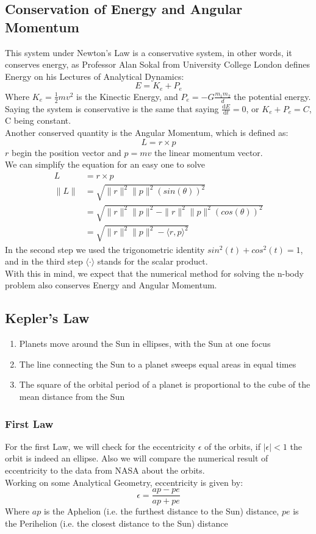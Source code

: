 \documentclass[12pt]{article}
\begin{document}
\subsection{Conservation of Energy and Angular Momentum}
This system under Newton's Law is a conservative system, in other words, it conserves energy, as Professor Alan Sokal\cite{sokal:22} from University College London defines Energy on his Lectures of Analytical Dynamics:
\[
E = K_e + P_e
\]
Where \(K_e = \frac{1}{2} m v^2\) is the Kinectic Energy, and \(P_e = - G \frac{m_1m_2}{d}\) the potential energy.
Saying the system is conservative is the same that saying \(\frac{\mathrm{d}E}{\mathrm{d}t} = 0\), or \( K_e + P_e = C\), C being constant.\\
Another conserved quantity is the Angular Momentum, which is defined as:
\[
L = r \times p
\]
\(r\) begin the position vector and \(p = mv\) the linear momentum vector.\\
We can simplify the equation for an easy one to solve
\begin{align*}
  L &= r \times p\\
  \lVert L \rVert &= \sqrt{\rVert r \lVert^2 \rVert p \lVert^2(sin(\theta))^2} \\
  &= \sqrt{\rVert r \lVert^2 \rVert p \lVert^2 - \rVert r \lVert^2 \rVert p \lVert^2(cos(\theta))^2} \\
  &= \sqrt{\rVert r \lVert^2 \rVert p \lVert^2 - \langle r, p \rangle ^2}
\end{align*}
In the second step we used the trigonometric identity \(sin^2 (t) + cos^2(t) = 1\), and in the third step \(\langle \cdot \rangle\) stands for the scalar product.\\
With this in mind, we expect that the numerical method for solving the n-body problem also conserves Energy and Angular Momentum.

\subsection{Kepler's Law}
\begin{enumerate}
  \item Planets move around the Sun in ellipses, with the Sun at one focus
  \item The line connecting the Sun to a planet sweeps equal areas in equal times
  \item The square of the orbital period of a planet is proportional to the cube of the mean distance from the Sun
\end{enumerate}
\subsubsection{First Law}
For the first Law, we will check for the eccentricity \(\epsilon \) of the orbits, if \(\lvert \epsilon \rvert < 1\) the orbit is indeed an ellipse. Also we will compare the numerical result of eccentricity to the data from NASA about the orbits.\\
Working on some Analytical Geometry, eccentricity is given by:
\[
\epsilon = \frac{ap - pe}{ap + pe}
\]
Where \(ap\) is the Aphelion (i.e. the furthest distance to the Sun) distance, \(pe\) is the Perihelion (i.e. the closest distance to the Sun) distance
\end{document}
